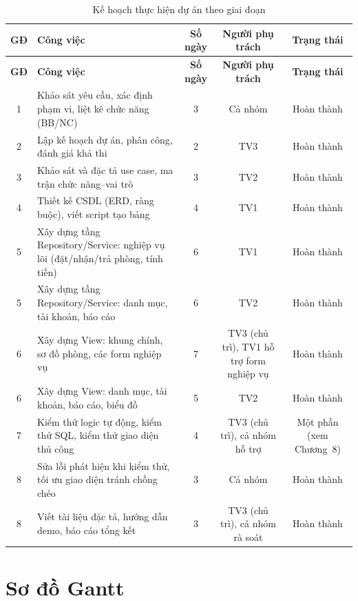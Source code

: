 \documentclass[14pt]{report}
\begin{document}
\begin{longtable}{|c|p{3.5cm}|c|c|c|}
\caption{Kế hoạch thực hiện dự án theo giai đoạn}\label{tab:kehoach}\\
\hline
\textbf{GĐ} & \textbf{Công việc} & \textbf{Số ngày} & \textbf{Người phụ trách} & \textbf{Trạng thái}\\\hline
\endfirsthead
\hline \textbf{GĐ} & \textbf{Công việc} & \textbf{Số ngày} & \textbf{Người phụ trách} & \textbf{Trạng thái}\\\hline
\endhead
1 & Khảo sát yêu cầu, xác định phạm vi, liệt kê chức năng (BB/NC) & 3 & Cả nhóm & Hoàn thành \\\hline
2 & Lập kế hoạch dự án, phân công, đánh giá khả thi & 2 & TV3 & Hoàn thành \\\hline
3 & Khảo sát và đặc tả use case, ma trận chức năng--vai trò & 3 & TV2 & Hoàn thành \\\hline
4 & Thiết kế CSDL (ERD, ràng buộc), viết script tạo bảng & 4 & TV1 & Hoàn thành \\\hline
5 & Xây dựng tầng Repository/Service: nghiệp vụ lõi (đặt/nhận/trả phòng, tính tiền) & 6 & TV1 & Hoàn thành \\\hline
5 & Xây dựng tầng Repository/Service: danh mục, tài khoản, báo cáo & 6 & TV2 & Hoàn thành \\\hline
6 & Xây dựng View: khung chính, sơ đồ phòng, các form nghiệp vụ & 7 & TV3 (chủ trì), TV1 hỗ trợ form nghiệp vụ & Hoàn thành \\\hline
6 & Xây dựng View: danh mục, tài khoản, báo cáo, biểu đồ & 5 & TV2 & Hoàn thành \\\hline
7 & Kiểm thử logic tự động, kiểm thử SQL, kiểm thử giao diện thủ công & 4 & TV3 (chủ trì), cả nhóm hỗ trợ & Một phần (xem Chương~8) \\\hline
8 & Sửa lỗi phát hiện khi kiểm thử, tối ưu giao diện tránh chồng chéo & 3 & Cả nhóm & Hoàn thành \\\hline
8 & Viết tài liệu đặc tả, hướng dẫn demo, báo cáo tổng kết & 3 & TV3 (chủ trì), cả nhóm rà soát & Hoàn thành \\\hline
\end{longtable}


\section{Sơ đồ Gantt}
\end{document}
